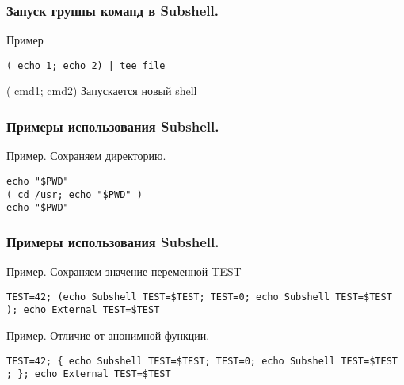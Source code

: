 \begin{frame}[fragile]
	\frametitle{Запуск группы команд в Subshell.}
	
	\begin{block}{Пример}
\begin{lstlisting}
( echo 1; echo 2) | tee file
\end{lstlisting}
	\end{block}
	\begin{block}{( cmd1; cmd2)}
	    Запускается новый shell
	\end{block}
\end{frame}

\begin{frame}[fragile]
	\frametitle{Примеры использования Subshell.}
	\begin{block}{Пример. Сохраняем директорию.}
\begin{lstlisting}
echo "$PWD"
( cd /usr; echo "$PWD" )
echo "$PWD"
\end{lstlisting}
	\end{block}
\end{frame}

\begin{frame}[fragile]
	\frametitle{Примеры использования Subshell.}
	\begin{block}{Пример. Сохраняем значение переменной TEST}
\begin{lstlisting}
TEST=42; (echo Subshell TEST=$TEST; TEST=0; echo Subshell TEST=$TEST ); echo External TEST=$TEST
\end{lstlisting}
	\end{block}
	\begin{block}{Пример. Отличие от анонимной функции.}
\begin{lstlisting}
TEST=42; { echo Subshell TEST=$TEST; TEST=0; echo Subshell TEST=$TEST ; }; echo External TEST=$TEST
\end{lstlisting}
	\end{block}
\end{frame}
